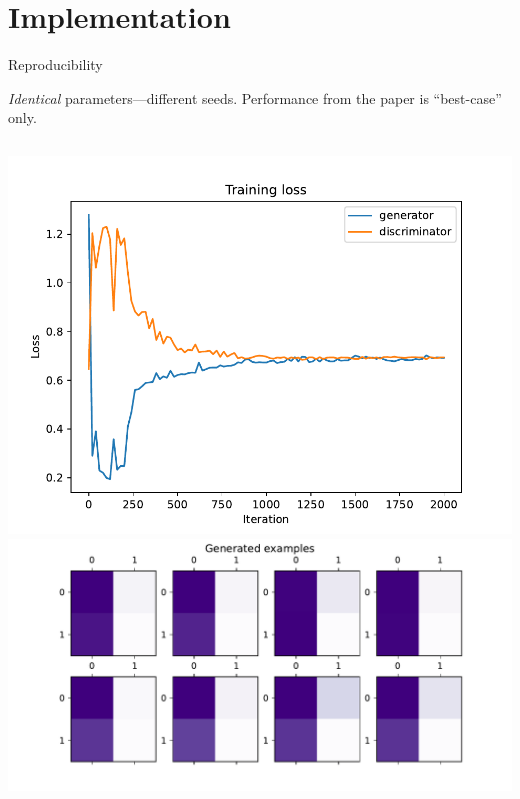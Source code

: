 \documentclass{beamer}
\begin{document}
\section{Implementation}
\begin{frame}{Reproducibility}

\emph{Identical} parameters---different seeds.  Performance from the paper is ``best-case'' only.

\begin{columns}
\centering
    \includegraphics[width=0.95\linewidth]{figures/training_loss_1.pdf}
    \includegraphics[width=0.95\linewidth]{figures/examples_1.pdf}


\end{columns}
\end{frame}
\end{document}
